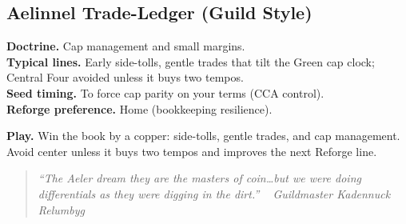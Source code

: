 \documentclass[11pt]{article}
\providecommand{\playdesc}[1]{\par\smallskip\noindent\small\textbf{Play.} #1\par}
\begin{document}
\subsection*{Aelinnel Trade-Ledger (Guild Style)}
\textbf{Doctrine.} Cap management and small margins.\\
\textbf{Typical lines.} Early side-tolls, gentle trades that tilt the Green cap clock; Central Four avoided unless it buys two tempos.\\
\textbf{Seed timing.} To force cap parity on your terms (CCA control).\\
\textbf{Reforge preference.} Home (bookkeeping resilience).
\playdesc{Win the book by a copper: side-tolls, gentle trades, and cap management. Avoid center unless it buys two tempos and improves the next Reforge line.}
\begin{quote}\small\itshape
``The Aeler dream they are the masters of coin\dots but we were doing differentials as they were digging in the dirt.'' ~ Guildmaster Kadennuck Relumbyg
\end{quote}
\end{document}
